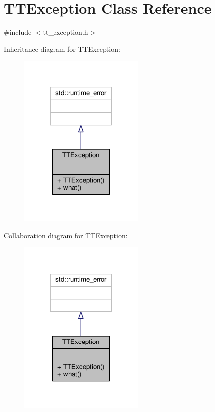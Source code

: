 \hypertarget{classTTException}{}\section{T\+T\+Exception Class Reference}
\label{classTTException}


{\ttfamily \#include $<$tt\+\_\+exception.\+h$>$}



Inheritance diagram for T\+T\+Exception\+:
\nopagebreak
\begin{figure}[H]
\begin{center}
\leavevmode
\includegraphics[width=173pt]{classTTException__inherit__graph}
\end{center}
\end{figure}


Collaboration diagram for T\+T\+Exception\+:
\nopagebreak
\begin{figure}[H]
\begin{center}
\leavevmode
\includegraphics[width=173pt]{classTTException__coll__graph}
\end{center}
\end{figure}
